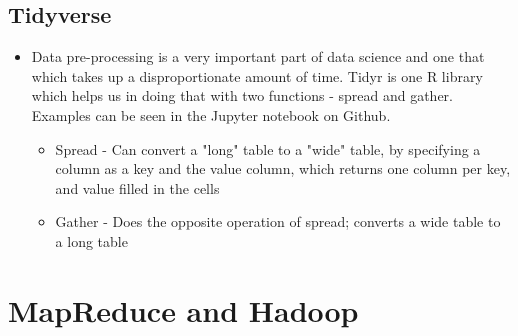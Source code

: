 \subsection{Tidyverse}
\begin{itemize}
    \item Data pre-processing is a very important part of data science and one that which takes up a disproportionate amount of time. Tidyr is one R library which helps us in doing that with two functions - spread and gather. Examples can be seen in the Jupyter notebook on Github.
    \begin{itemize}
        \item Spread - Can convert a "long" table to a "wide" table, by specifying a column as a key and the value column, which returns one column per key, and value filled in the cells
        \item Gather - Does the opposite operation of spread; converts a wide table to a long table
    \end{itemize}
\end{itemize}

\section{MapReduce and Hadoop}

